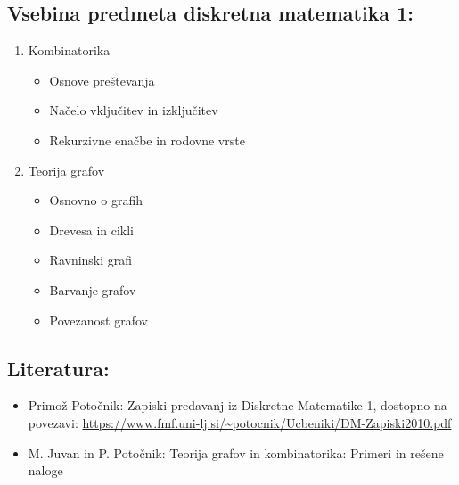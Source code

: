 \documentclass[a4paper, 10pt]{article}
\begin{document}
\subsection{Vsebina predmeta diskretna matematika 1:}
\begin{enumerate}

\item Kombinatorika
\begin{itemize}

\item Osnove preštevanja
\item Načelo vključitev in izključitev
\item Rekurzivne enačbe in rodovne vrste

\end{itemize}
\item Teorija grafov
\begin{itemize}

\item Osnovno o grafih
\item Drevesa in cikli
\item Ravninski grafi
\item Barvanje grafov
\item Povezanost grafov

\end{itemize}
\end{enumerate}

\subsection{Literatura:}
\begin{itemize}


\item Primož Potočnik: Zapiski predavanj iz Diskretne Matematike 1, dostopno na povezavi: \url{https://www.fmf.uni-lj.si/~potocnik/Ucbeniki/DM-Zapiski2010.pdf}

\item M. Juvan in P. Potočnik: Teorija grafov in kombinatorika: Primeri in rešene naloge
\end{itemize}
\end{document}
